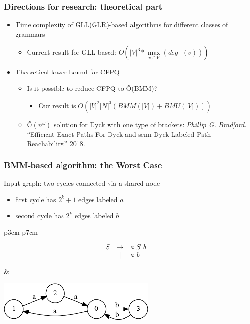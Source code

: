 \documentclass[xcolor=table]{beamer}
\begin{document}
\begin{frame} \frametitle{Directions for research: theoretical part}
\begin{itemize}
\item Time complexity of GLL(GLR)-based algorithms for different classes of grammars
\begin{itemize}
   \item Current result for GLL-based: $O\left(|V|^3*\max\limits_{v \in V}\left(deg^+\left(v\right)\right)\right)$
  \end{itemize}
\item Theoretical lower bound for CFPQ
\begin{itemize}
   \item Is it possible to reduce CFPQ to \~{O}(BMM)?
   \begin{itemize}
     \item Our result is  $O(|V|^2 |N|^3(BMM(|V|) + BMU(|V|)))$
   \end{itemize}
   \item \~{O}$(n^\omega)$ solution for Dyck with one type of brackets: \emph{Phillip G. Bradford.} ``Efficient Exact Paths For Dyck and semi-Dyck Labeled Path Reachability.'' 2018.
\end{itemize}

\end{itemize}
\end{frame}


\begin{frame}[fragile]
  \frametitle{BMM-based algorithm: the Worst Case}

Input graph: two cycles connected via a shared node

\begin{itemize}
	\item first cycle has $2^k + 1$ edges labeled $a$
	\item second cycle has $2^k$ edges labeled $b$
\end{itemize}


\begin{tabular}{p{3cm} p{7cm} }
\begin{figure}[h]
	\[
	\begin{array}{ccl}
	S & \rightarrow & \text{\emph{a}} \ S \ \text{\emph{b}} \\
	  & |           & \text{\emph{a}} \ \text{\emph{b}} \\
	\end{array}
	\]

\end{figure}

&

\begin{center}
  \includegraphics[height=2cm]{pictures/example_graph.pdf}
\end{center}
  \end{tabular}
\end{frame}
\end{document}
